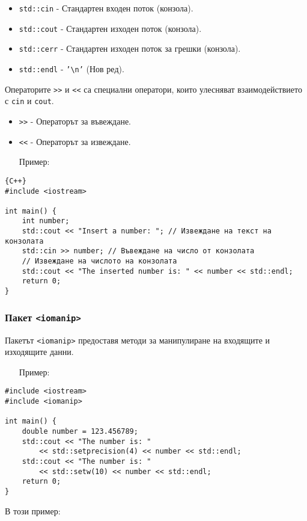 \documentclass[oneside]{book}
\newcommand*{\code}[1]{\texttt{#1}}
\newcommand*{\bs}{\textbackslash}
\begin{document}
\begin{itemize}
    \item \code{std::cin} - Стандартен входен поток (конзола).
    \item \code{std::cout} - Стандартен изходен поток (конзола).
    \item \code{std::cerr} - Стандартен изходен поток за грешки (конзола).
    \item \code{std::endl} - \code{'\bs n'} (Нов ред).
\end{itemize}

Операторите \code{>}\code{>} и \code{<}\code{<} са специални оператори, които улесняват взаимодействието с \code{cin} и \code{cout}.

\begin{itemize}
    \item \code{>}\code{>} - Операторът за въвеждане.
    \item \code{<}\code{<} - Операторът за извеждане.
\end{itemize}
\pagebreak
\begin{itemize}
    \item[Пример:]
\end{itemize} 
\begin{mdframed}\begin{lstlisting}{C++}
#include <iostream>

int main() {
    int number;
    std::cout << "Insert a number: "; // Извеждане на текст на конзолата
    std::cin >> number; // Въвеждане на число от конзолата
    // Извеждане на числото на конзолата
    std::cout << "The inserted number is: " << number << std::endl;
    return 0;
}
\end{lstlisting}\end{mdframed}

\subsubsection{Пакет \code{<iomanip>}}
Пакетът \code{<iomanip>} предоставя методи за манипулиране на входящите и изходящите данни.

\begin{itemize}
    \item[Пример:]
\end{itemize} 
\begin{mdframed}\begin{lstlisting}
#include <iostream>
#include <iomanip>

int main() {
    double number = 123.456789;
    std::cout << "The number is: " 
        << std::setprecision(4) << number << std::endl;
    std::cout << "The number is: " 
        << std::setw(10) << number << std::endl;
    return 0;
}
\end{lstlisting}\end{mdframed}
В този пример:
\end{document}
